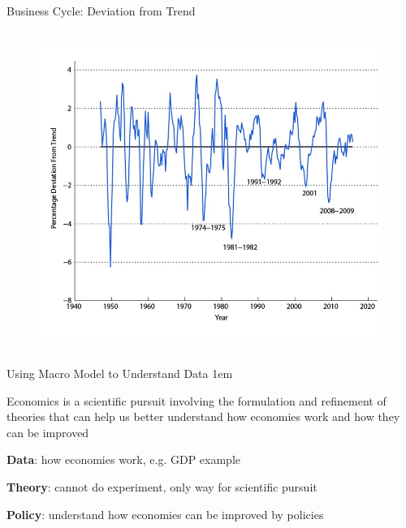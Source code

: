 \documentclass[11pt,aspectratio=43]{beamer}
\let\olditemize=\itemize
\let\endolditemize=\enditemize
\renewenvironment{itemize}{\olditemize \itemsep1em}{\endolditemize}
\theoremstyle{definition}
\begin{document}
\begin{frame}{Business Cycle: Deviation from Trend}
\begin{columns}
\begin{column}{0.5\textwidth}
\begin{figure}
                \includegraphics[width=\textwidth]{./figures/Figure1_13.jpg}
            \end{figure}
        \end{column}
    \end{columns}
\end{frame}

\begin{frame}{Using Macro Model to Understand Data}
\label{slide:Using_Macro_Model_to_Understand_Data}
    \begin{itemize}
        \item Economics is a \alert{scientific pursuit} involving the formulation and \alert{refinement of theories} that can help us better understand \alert{how economies work} and \alert{how they can be improved}
        \item \textbf{Data}: \alert{how economies work}, e.g. GDP example
        \item \textbf{Theory}: cannot do experiment, only way for \alert{scientific pursuit}
        \item \textbf{Policy}: understand \alert{how economies can be improved} by \alert{policies}
    \end{itemize}
\end{frame}
\end{document}
